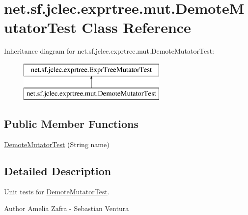 \hypertarget{classnet_1_1sf_1_1jclec_1_1exprtree_1_1mut_1_1_demote_mutator_test}{\section{net.\-sf.\-jclec.\-exprtree.\-mut.\-Demote\-Mutator\-Test Class Reference}
\label{classnet_1_1sf_1_1jclec_1_1exprtree_1_1mut_1_1_demote_mutator_test}
}
Inheritance diagram for net.\-sf.\-jclec.\-exprtree.\-mut.\-Demote\-Mutator\-Test\-:\begin{figure}[H]
\begin{center}
\leavevmode
\includegraphics[height=2.000000cm]{classnet_1_1sf_1_1jclec_1_1exprtree_1_1mut_1_1_demote_mutator_test}
\end{center}
\end{figure}
\subsection*{Public Member Functions}
\begin{DoxyCompactItemize}
\item 
\hyperlink{classnet_1_1sf_1_1jclec_1_1exprtree_1_1mut_1_1_demote_mutator_test_a5a95a3ebf309c64e9ac996c54a569d5d}{Demote\-Mutator\-Test} (String name)
\end{DoxyCompactItemize}


\subsection{Detailed Description}
Unit tests for \hyperlink{classnet_1_1sf_1_1jclec_1_1exprtree_1_1mut_1_1_demote_mutator_test}{Demote\-Mutator\-Test}.

\begin{DoxyAuthor}{Author}
Amelia Zafra -\/ Sebastian Ventura 
\end{DoxyAuthor}


